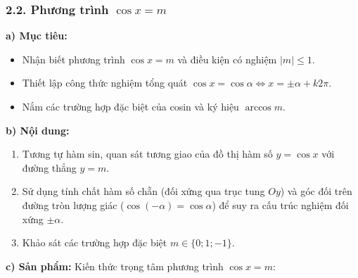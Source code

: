 \documentclass[12pt, a4paper]{article}
\begin{document}
\subsubsection*{2.2. Phương trình $\cos x = m$}  
  
\noindent \textbf{a) Mục tiêu:}  
\begin{itemize}[leftmargin=0.8cm]  
    \item Nhận biết phương trình $\cos x = m$ và điều kiện có nghiệm $|m| \le 1$.  
    \item Thiết lập công thức nghiệm tổng quát $\cos x = \cos\alpha \iff x = \pm\alpha + k2\pi$.  
    \item Nắm các trường hợp đặc biệt của cosin và ký hiệu $\arccos m$.  
\end{itemize}  
  
\noindent \textbf{b) Nội dung:}  
\begin{enumerate}[leftmargin=0.6cm]  
    \item Tương tự hàm sin, quan sát tương giao của đồ thị hàm số $y = \cos x$ với đường thẳng $y = m$.  
    \item Sử dụng tính chất hàm số chẵn (đối xứng qua trục tung $Oy$) và góc đối trên đường tròn lượng giác ($\cos(-\alpha) = \cos\alpha$) để suy ra cấu trúc nghiệm đối xứng $\pm\alpha$.  
    \item Khảo sát các trường hợp đặc biệt $m \in \{0; 1; -1\}$.  
\end{enumerate}  
  
\noindent \textbf{c) Sản phẩm:}  
Kiến thức trọng tâm phương trình $\cos x = m$:  
  
\end{document}
